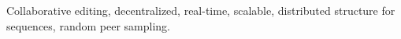 \begin{keywords}
  Collaborative editing, decentralized, real-time, scalable,
  distributed structure for sequences, random peer sampling.
\end{keywords}






